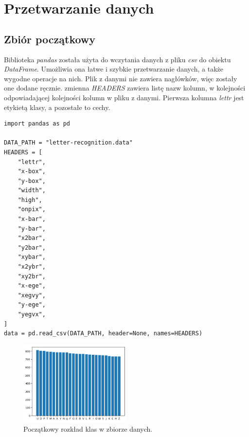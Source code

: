 \section{Przetwarzanie danych}\label{sec:przetwarzanie_danych}
\subsection{Zbiór początkowy}\label{subsec:filtrowanie_danych}
Biblioteka \textit{pandas}\cite{mckinney-proc-scipy-2010} została użyta do wczytania danych z pliku \textit{csv} do obiektu \textit{DataFrame}.
Umożliwia ona łatwe i szybkie przetwarzanie danych, a także wygodne operacje na nich. Plik z danymi nie zawiera nagłówków, więc zostały one dodane ręcznie.
zmienna \textit{HEADERS} zawiera listę nazw kolumn, w kolejności odpowiadającej kolejności kolumn w pliku z danymi. Pierwsza kolumna \textit{lettr} jest etykietą klasy, a pozostałe to cechy.
\begin{verbatim}
import pandas as pd

DATA_PATH = "letter-recognition.data"
HEADERS = [
    "lettr",
    "x-box",
    "y-box",
    "width",
    "high",
    "onpix",
    "x-bar",
    "y-bar",
    "x2bar",
    "y2bar",
    "xybar",
    "x2ybr",
    "xy2br",
    "x-ege",
    "xegvy",
    "y-ege",
    "yegvx",
]
data = pd.read_csv(DATA_PATH, header=None, names=HEADERS)
\end{verbatim}
\begin{figure}
    \centering
    \includegraphics[width=0.5\textwidth]{img/bar_letter_count_initial.png}
    \caption{Początkowy rozkład klas w zbiorze danych.}
    \label{fig:bar_letter_count_initial}
\end{figure}